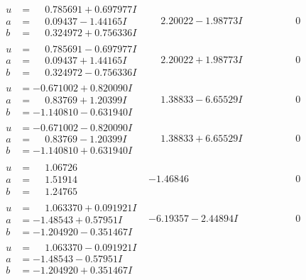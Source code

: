 \documentclass[1p]{elsarticle_modified}
\theoremstyle{definition}
\begin{document}
$$\begin{array}{c|c|c}
\begin{aligned}
u &= \phantom{-}0.785691 + 0.697977 I \\
a &= \phantom{-}0.09437 - 1.44165 I \\
b &= \phantom{-}0.324972 + 0.756336 I\end{aligned}
 & \phantom{-}2.20022 - 1.98773 I & \phantom{-0.000000 } 0 \\ \hline\begin{aligned}
u &= \phantom{-}0.785691 - 0.697977 I \\
a &= \phantom{-}0.09437 + 1.44165 I \\
b &= \phantom{-}0.324972 - 0.756336 I\end{aligned}
 & \phantom{-}2.20022 + 1.98773 I & \phantom{-0.000000 } 0 \\ \hline\begin{aligned}
u &= -0.671002 + 0.820090 I \\
a &= \phantom{-}0.83769 + 1.20399 I \\
b &= -1.140810 - 0.631940 I\end{aligned}
 & \phantom{-}1.38833 - 6.65529 I & \phantom{-0.000000 } 0 \\ \hline\begin{aligned}
u &= -0.671002 - 0.820090 I \\
a &= \phantom{-}0.83769 - 1.20399 I \\
b &= -1.140810 + 0.631940 I\end{aligned}
 & \phantom{-}1.38833 + 6.65529 I & \phantom{-0.000000 } 0 \\ \hline\begin{aligned}
u &= \phantom{-}1.06726\phantom{ +0.000000I} \\
a &= \phantom{-}1.51914\phantom{ +0.000000I} \\
b &= \phantom{-}1.24765\phantom{ +0.000000I}\end{aligned}
 & -1.46846\phantom{ +0.000000I} & \phantom{-0.000000 } 0 \\ \hline\begin{aligned}
u &= \phantom{-}1.063370 + 0.091921 I \\
a &= -1.48543 + 0.57951 I \\
b &= -1.204920 - 0.351467 I\end{aligned}
 & -6.19357 - 2.44894 I & \phantom{-0.000000 } 0 \\ \hline\begin{aligned}
u &= \phantom{-}1.063370 - 0.091921 I \\
a &= -1.48543 - 0.57951 I \\
b &= -1.204920 + 0.351467 I\end{aligned}

\end{array}$$
\end{document}
